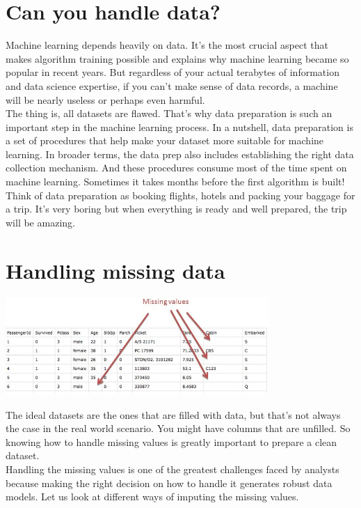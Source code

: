 \documentclass{42-en}
\begin{document}
\section*{Can you handle data?}

Machine learning depends heavily on data. It’s the most crucial aspect that makes algorithm training possible and explains why machine learning became so popular in recent years. But regardless of your actual terabytes of information and data science expertise, if you can’t make sense of data records, a machine will be nearly useless or perhaps even harmful.\\

The thing is, all datasets are flawed. That’s why data preparation is such an important step in the machine learning process. In a nutshell, data preparation is a set of procedures that help make your dataset more suitable for machine learning. In broader terms, the data prep also includes establishing the right data collection mechanism. And these procedures consume most of the time spent on machine learning. Sometimes it takes months before the first algorithm is built!\\

Think of data preparation as booking flights, hotels and packing your baggage for a trip. It’s very boring but when everything is ready and well prepared, the trip will be amazing.\\

\section*{Handling missing data}

\centerline{\includegraphics[width=100mm]{images/missing-values.png}}

The ideal datasets are the ones that are filled with data, but that’s not always the case in the real world scenario. You might have columns that are unfilled. So knowing how to handle missing values is greatly important to prepare a clean dataset.\\

Handling the missing values is one of the greatest challenges faced by analysts because making the right decision on how to handle it generates robust data models. Let us look at different ways of imputing the missing values.\\
\end{document}
